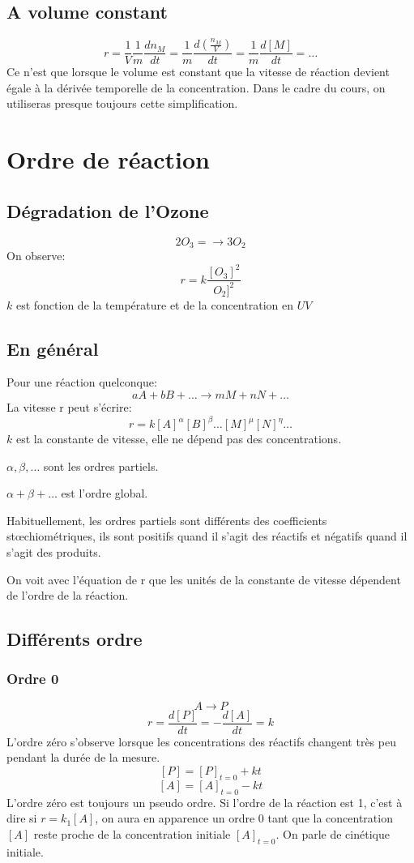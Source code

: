 \subsection{A volume constant}
\[ r = \frac 1V \frac 1m \frac {dn_M}{dt} =
  \frac 1m \frac {d\left(\frac {n_M}V\right)}{dt} =
  \frac 1m \frac {d[M]}{dt} = \ldots \]
Ce n'est que lorsque le volume est constant que la vitesse de
réaction devient égale à la dérivée temporelle de la concentration.
Dans le cadre du cours, on utiliseras presque toujours cette simplification.
\section{Ordre de réaction}
\subsection{Dégradation de l'Ozone}
\[ 2O_3 = \longrightarrow 3O_2 \]
On observe:
\[  r = k \frac{[O_3]^2}{O_2]^2} \]
$k$ est fonction de la température et de la concentration en $UV$

\subsection{En général}
Pour une réaction quelconque:
\[ aA+bB+\ldots \longrightarrow mM + nN + \ldots \]
La vitesse r peut s'écrire:
\[  r = k[A]^{\alpha}[B]^{\beta}\ldots[M]^{\mu}[N]^{\eta}\ldots \]
$k$ est la constante de vitesse, elle ne dépend pas des concentrations.

$\alpha,\beta,\ldots$ sont les ordres partiels.

$\alpha+\beta+\ldots$ est l'ordre global.

Habituellement, les ordres partiels sont différents
des coefficients stœchiométriques,
ils sont positifs quand il s'agit des réactifs et
négatifs quand il s'agit des produits.

On voit avec l'équation de r que les unités de
la constante de vitesse dépendent de l'ordre de la réaction.

\subsection{Différents ordre}
\subsubsection{Ordre 0}
\[ A\longrightarrow P \]
\[ r = \frac{d[P]}{dt} = -\frac{d[A]}{dt} = k \]
L'ordre zéro s'observe lorsque les concentrations des réactifs
changent très peu pendant la durée de la mesure.
\[ [P] = [P]_{t = 0}+kt \]
\[ [A] = [A]_{t = 0}-kt \]
L'ordre zéro est toujours un pseudo ordre.
Si l'ordre de la réaction est 1, c'est à dire si $r = k_1[A]$,
on aura en apparence un ordre 0 tant que la concentration $[A]$
reste proche de la concentration initiale $[A]_{t = 0}$.
On parle de cinétique initiale.

